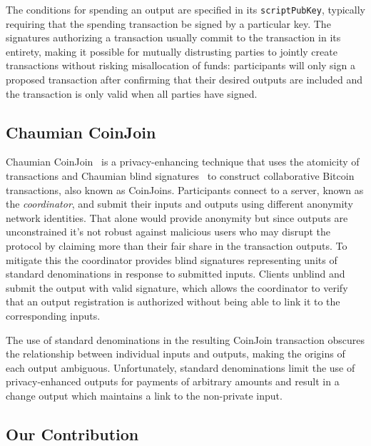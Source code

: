 \documentclass[a4paper]{article}
\begin{document}
The conditions for spending an output are specified in its \texttt{scriptPubKey}, typically requiring that the spending transaction be signed by a particular key. The signatures authorizing a transaction usually commit to the transaction in its entirety, making it possible for mutually distrusting parties to jointly create transactions without risking misallocation of funds: participants will only sign a proposed transaction after confirming that their desired outputs are included and the transaction is only valid when all parties have signed.

\subsection{Chaumian CoinJoin}

Chaumian CoinJoin~\cite{mizrahi2013blind,maxwell2013coinjoin,zerolink} is a privacy-enhancing technique that uses the atomicity of transactions and Chaumian blind signatures~\cite{chaum1983blind} to construct collaborative Bitcoin transactions, also known as CoinJoins. Participants connect to a server, known as the \emph{coordinator}, and submit their inputs and outputs using different anonymity network identities. That alone would provide anonymity but since outputs are unconstrained it's not robust against malicious users who may disrupt the protocol by claiming more than their fair share in the transaction outputs. To mitigate this the coordinator provides blind signatures representing units of standard denominations in response to submitted inputs. Clients unblind and submit the output with valid signature, which allows the coordinator to verify that an output registration is authorized without being able to link it to the corresponding inputs.

The use of standard denominations in the resulting CoinJoin transaction obscures the relationship between individual inputs and outputs, making the origins of each output ambiguous. Unfortunately, standard denominations limit the use of privacy-enhanced outputs for payments of arbitrary amounts and result in a change output which maintains a link to the non-private input.

\subsection{Our Contribution}
\end{document}
